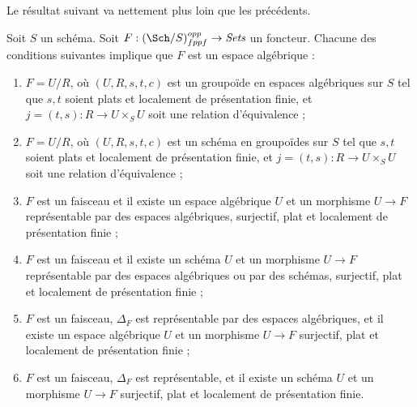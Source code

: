 \noindent
Le résultat suivant va nettement plus loin que les précédents.

\begin{theorem}
\label{theorem-final-bootstrap}
Soit $S$ un schéma.
Soit $F : (\Sch/S)_{fppf}^{opp} \to \textit{Sets}$ un foncteur.
Chacune des conditions suivantes implique que $F$ est un espace algébrique :
\begin{enumerate}
\item $F = U/R$, où $(U, R, s, t, c)$ est un groupoïde en espaces algébriques
sur $S$ tel que $s, t$ soient plats et localement de présentation finie, et
$j = (t, s) : R \to U \times_S U$ soit une relation d'équivalence ;
\item $F = U/R$, où $(U, R, s, t, c)$ est un schéma en groupoïdes
sur $S$ tel que $s, t$ soient plats et localement de présentation finie, et
$j = (t, s) : R \to U \times_S U$ soit une relation d'équivalence ;
\item $F$ est un faisceau et il existe un espace algébrique $U$ et un morphisme
$U \to F$ représentable par des espaces algébriques,
surjectif, plat et localement de présentation finie ;
\item $F$ est un faisceau et il existe un schéma $U$ et un morphisme
$U \to F$ représentable par des espaces algébriques ou par des schémas,
surjectif, plat et localement de présentation finie ;
\item $F$ est un faisceau, $\Delta_F$ est représentable par des espaces algébriques,
et il existe un espace algébrique $U$ et un morphisme $U \to F$
surjectif, plat et localement de présentation finie ;
\item $F$ est un faisceau, $\Delta_F$ est représentable,
et il existe un schéma $U$ et un morphisme $U \to F$
surjectif, plat et localement de présentation finie.
\end{enumerate}
\end{theorem}

